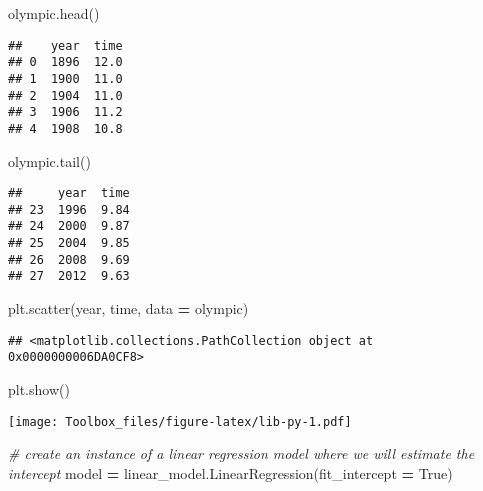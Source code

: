 \documentclass[
]{book}
\newenvironment{Shaded}{\begin{snugshade}}{\end{snugshade}}
\newcommand{\CommentTok}[1]{\textcolor[rgb]{0.56,0.35,0.01}{\textit{#1}}}
\newcommand{\NormalTok}[1]{#1}
\newcommand{\OperatorTok}[1]{\textcolor[rgb]{0.81,0.36,0.00}{\textbf{#1}}}
\newcommand{\StringTok}[1]{\textcolor[rgb]{0.31,0.60,0.02}{#1}}
\newcommand{\VariableTok}[1]{\textcolor[rgb]{0.00,0.00,0.00}{#1}}
\begin{document}
\begin{Shaded}
\begin{Highlighting}[]
\NormalTok{olympic.head()}
\end{Highlighting}
\end{Shaded}

\begin{verbatim}
##    year  time
## 0  1896  12.0
## 1  1900  11.0
## 2  1904  11.0
## 3  1906  11.2
## 4  1908  10.8
\end{verbatim}

\begin{Shaded}
\begin{Highlighting}[]
\NormalTok{olympic.tail()}
\end{Highlighting}
\end{Shaded}

\begin{verbatim}
##     year  time
## 23  1996  9.84
## 24  2000  9.87
## 25  2004  9.85
## 26  2008  9.69
## 27  2012  9.63
\end{verbatim}

\begin{Shaded}
\begin{Highlighting}[]
\NormalTok{plt.scatter(}\StringTok{\textquotesingle{}year\textquotesingle{}}\NormalTok{, }\StringTok{\textquotesingle{}time\textquotesingle{}}\NormalTok{, data }\OperatorTok{=}\NormalTok{ olympic)}
\end{Highlighting}
\end{Shaded}

\begin{verbatim}
## <matplotlib.collections.PathCollection object at 0x0000000006DA0CF8>
\end{verbatim}

\begin{Shaded}
\begin{Highlighting}[]
\NormalTok{plt.show()}
\end{Highlighting}
\end{Shaded}

\texttt{[image: Toolbox\_files/figure-latex/lib-py-1.pdf]}

\begin{Shaded}
\begin{Highlighting}[]
\CommentTok{\# create an instance of a linear regression model where we will estimate the intercept}
\NormalTok{model }\OperatorTok{=}\NormalTok{ linear\_model.LinearRegression(fit\_intercept }\OperatorTok{=} \VariableTok{True}\NormalTok{)}
\end{Highlighting}
\end{Shaded}
\end{document}
